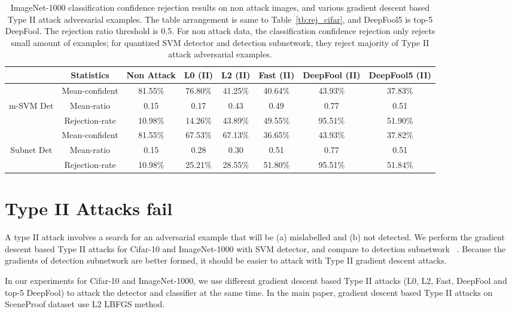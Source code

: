 \documentclass[10pt,twocolumn,letterpaper]{article}
\begin{document}
\begin{table*}[h!]
\begin{center}
\resizebox{0.88\textwidth}{!}
{
\begin{tabular}{  c | c | c | c | c | c | c | c }
 & Statistics & Non Attack & L0 (II) & L2 (II) & Fast (II) & DeepFool (II) & DeepFool5 (II) \\
\hline
	 & Mean-confident & 81.55\% & 76.80\% & 41.25\% & 40.64\% & 43.93\% & 37.83\% \\
m-SVM Det & Mean-ratio & 0.15 & 0.17 & 0.43 & 0.49 & 0.77 & 0.51 \\
	 & Rejection-rate & 10.98\% & 14.26\% & 43.89\% & 49.55\% & 95.51\% & 51.90\% \\
\hline
	 & Mean-confident & 81.55\% & 67.53\% & 67.13\% & 36.65\% & 43.93\% & 37.82\% \\
Subnet Det & Mean-ratio & 0.15 & 0.28 & 0.30 & 0.51 & 0.77 & 0.51 \\
	 & Rejection-rate & 10.98\% & 25.21\% & 28.55\% & 51.80\% & 95.51\% & 51.84\% \\
\end{tabular}
}
\caption{ImageNet-1000 classification confidence rejection results on non attack images, and various gradient descent based Type II attack adversarial examples. 
The table arrangement is same to Table~\ref{tb:rej_cifar}, and DeepFool5 is top-5 DeepFool. The rejection ratio threshold is 0.5. For non attack data, the classification 
confidence rejection only rejects small 
amount of examples; for  quantized SVM  detector and detection subnetwork, they reject majority of Type II attack adversarial examples. }
\label{tb:rej_imagenet}
\end{center}
\end{table*}

\section{Type II Attacks fail}
A type II attack involves a search for an adversarial example that will be (a) mislabelled and (b) not detected. 
We perform the gradient descent based Type II attacks for Cifar-10 and ImageNet-1000 with SVM detector, and compare to detection subnetwork 
~\cite{metzen2017detecting}. Because the gradients of detection subnetwork are better formed, it should be easier to attack with Type II gradient descent attacks. 

In our experiments for Cifar-10 and ImageNet-1000, we use different gradient descent based Type II attacks (L0, L2, Fast, DeepFool and top-5 DeepFool) to attack 
the detector and classifier at the same time. In the main paper, gradient descent based Type II attacks on SceneProof dataset use L2 LBFGS method. 
\end{document}
